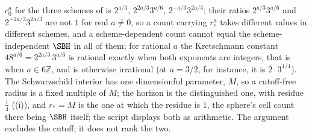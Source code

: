 $c_0^a$ for the three schemes of  is $2^{a/3}$, $2^{2a/3}3^{a/6}$, $2^{-a/3}3^{2a/3}$; their ratios $2^{a/3}3^{a/6}$ and $2^{-2a/3}3^{2a/3}$ are not $1$ for real $a \neq 0$, so a count carrying $r_c^a$ takes different values in different schemes, and a scheme-dependent count cannot equal the scheme-independent $\SBH$ in all of them; for rational $a$ the Kretschmann constant $48^{a/6} = 2^{2a/3}\,3^{a/6}$ is rational exactly when both exponents are integers, that is when $a \in 6\mathbb{Z}$, and is otherwise irrational (at $a = 3/2$, for instance, it is $2\cdot 3^{1/4}$). The Schwarzschild interior has one dimensionful parameter, $M$, so a cutoff-free radius is a fixed multiple of $M$; the horizon is the distinguished one, with residue $\tfrac14$ ((i)), and $r_* = M$ is the one at which the residue is $1$, the sphere's cell count there being $\SBH$ itself; the script displays both as arithmetic. The argument excludes the cutoff; it does not rank the two.
